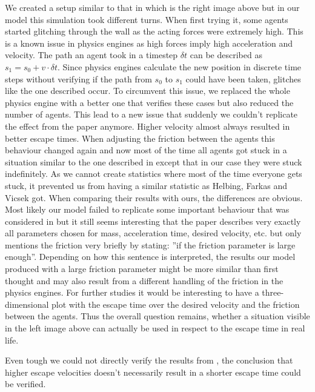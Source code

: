 \documentclass[11pt]{article}
\begin{document}
We created a setup similar to that in \cite{Helbing} which is the right image above but in our model this simulation took different turns. When first trying it, some agents started glitching through the wall as the acting forces were extremely high. This is a known issue in physics engines as high forces imply high acceleration and velocity. The path an agent took in a timestep $\delta t$ can be described as $s_1 = s_0 + v\cdot \delta t$.  Since physics engines calculate the new position in discrete time steps without verifying if the path from $s_0$ to $s_1$ could have been taken, glitches like the one described occur. To circumvent this issue, we replaced the whole physics engine with a better one that verifies these cases but also reduced the number of agents. This lead to a new issue that suddenly we couldn't replicate the effect from the paper anymore. Higher velocity almost always resulted in better escape times. When adjusting the friction between the agents this behaviour changed again and now most of the time all agents got stuck in a situation similar to the one described in \cite{Helbing} except that in our case they were stuck indefinitely. As we cannot create statistics where most of the time everyone gets stuck, it prevented us from having a similar statistic as Helbing, Farkas and Vicsek got. When comparing their results with ours, the differences are obvious. Most likely our model failed to replicate some important behaviour that was considered in \cite{Helbing} but it still seems interesting that the paper describes very exactly all parameters chosen for mass, acceleration time, desired velocity, etc. but only mentions the friction very briefly by stating: ''if the friction parameter is large enough''\cite{Helbing}. Depending on how this sentence is interpreted, the results our model produced with a large friction parameter might be more similar than first thought and may also result from a different handling of the friction in the physics engines. For further studies it would be interesting to have a three-dimensional plot with the escape time over the desired velocity and the friction between the agents. Thus the overall question remains, whether a situation visible in the left image above can actually be used in respect to the escape time in real life.

Even tough we could not directly verify the results from \cite{Helbing}, the conclusion that higher escape velocities doesn't necessarily result in a shorter escape time could be verified.
\end{document}
